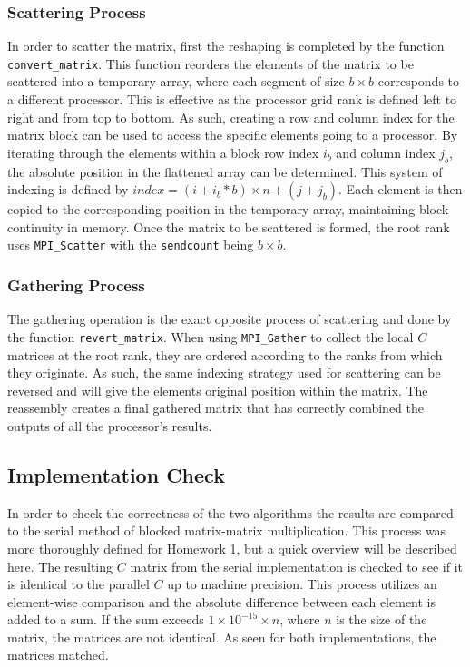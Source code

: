 \documentclass{article}
\begin{document}
\subsubsection{Scattering Process}
In order to scatter the matrix, first the reshaping is completed by the function \texttt{convert\_matrix}. This function reorders the elements of the matrix to be scattered into a temporary array, where each segment of size $b \times b$ corresponds to a different processor. This is effective as the processor grid rank is defined left to right and from top to bottom. As such, creating a row and column index for the matrix block can be used to access the specific elements going to a processor. By iterating through the elements within a block row index $i_{b}$ and column index $j_{b}$, the absolute position in the flattened array can be determined. This system of indexing is defined by $index = (i + i_{b} * b) \times n + (j + j_{b})$. Each element is then copied to the corresponding position in the temporary array, maintaining block continuity in memory. Once the matrix to be scattered is formed, the root rank uses \texttt{MPI\_Scatter} with the \texttt{sendcount} being $b \times b$.

\subsubsection{Gathering Process}
The gathering operation is the exact opposite process of scattering and done by the function \texttt{revert\_matrix}. When using \texttt{MPI\_Gather} to collect the local \( C \) matrices at the root rank, they are ordered according to the ranks from which they originate. As such, the same indexing strategy used for scattering can be reversed and will give the elements original position within the matrix. The reassembly creates a final gathered matrix that has correctly combined the outputs of all the processor's results. 

\subsection{Implementation Check}
In order to check the correctness of the two algorithms the results are compared to the serial method of blocked matrix-matrix multiplication. This process was more thoroughly defined for Homework 1, but a quick overview will be described here. The resulting \( C\) matrix from the serial implementation is checked to see if it is identical to the parallel \( C\) up to machine precision. This process utilizes an element-wise comparison and the absolute difference between each element is added to a sum. If the sum exceeds \( 1 \times 10^{-15} \times n \), where \( n \) is the size of the matrix, the matrices are not identical. As seen for both implementations, the matrices matched.
\end{document}
